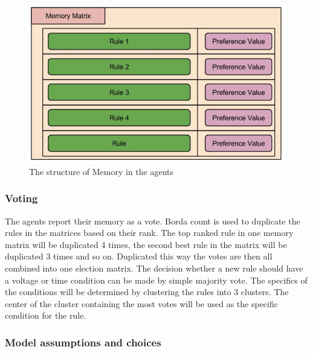 \documentclass[a4paper]{article}
\begin{document}
\begin{figure}[!ht]
\includegraphics[width =\textwidth]{concept_memory.jpg}
\caption{The structure of Memory in the agents}
\label{Memory_structure}
\end{figure}


\subsubsection{Voting}
The agents report their memory as a vote. Borda count is used to duplicate the rules in the matrices based on their rank. 
The top ranked rule in one memory matrix will be duplicated 4 times, the second best rule in the matrix will be duplicated 3
times and so on. Duplicated this way the votes are then all combined into one election matrix. The decision whether a new rule
should have a voltage or time condition can be made by simple majority vote. The specifics of the conditions will be 
determined by clustering the rules into 3 clusters. The center of the cluster containing the most votes will be used as 
the specific condition for the rule.


\subsubsection{Model assumptions and choices}
\end{document}
